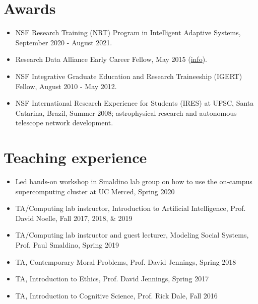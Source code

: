\documentclass[letterpaper,11pt,oneside]{article}
\begin{document}

\noindent
\section*{\textcolor{gunmetal}{Awards}}
\begin{itemize}
  \item NSF Research Training (NRT) Program in Intelligent Adaptive Systems, September 2020 - August 2021.
  \item Research Data Alliance Early Career Fellow, May 2015
    (\href{https://rd-alliance.org/rda_us data share program}{info}).
  \item NSF Integrative Graduate Education and Research Traineeship (IGERT) Fellow, August 2010 - May 2012.
  \item NSF International Research Experience for Students (IRES) at UFSC,
    Santa Catarina, Brazil, Summer 2008;
    astrophysical research and autonomous telescope network development.
\end{itemize}

\noindent
\section*{\textcolor{gunmetal}{Teaching experience}}
\begin{itemize}
  \item Led hands-on workshop in Smaldino lab group on how to use the on-campus supercomputing cluster at UC Merced, Spring 2020
  \item TA/Computing lab instructor, Introduction to Artificial Intelligence, Prof. David Noelle, Fall 2017, 2018, \& 2019
  \item TA/Computing lab instructor and guest lecturer, Modeling Social Systems, Prof. Paul Smaldino, Spring 2019
  \item TA, Contemporary Moral Problems, Prof. David Jennings, Spring 2018
  \item TA, Introduction to Ethics, Prof. David Jennings, Spring 2017
  \item TA, Introduction to Cognitive Science, Prof. Rick Dale, Fall 2016
\end{itemize}
\end{document}
